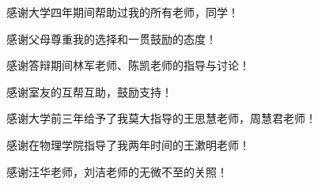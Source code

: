 \documentclass[winfonts]{njuthesis}
\begin{document}
\mainmatter








\begin{acknowledgement}
感谢大学四年期间帮助过我的所有老师，同学！

感谢父母尊重我的选择和一贯鼓励的态度！

感谢答辩期间林军老师、陈凯老师的指导与讨论！

感谢室友的互帮互助，鼓励支持！

感谢大学前三年给予了我莫大指导的王思慧老师，周慧君老师！

感谢在物理学院指导了我两年时间的王漱明老师！

感谢汪华老师，刘洁老师的无微不至的关照！
\end{acknowledgement}



\end{document}

